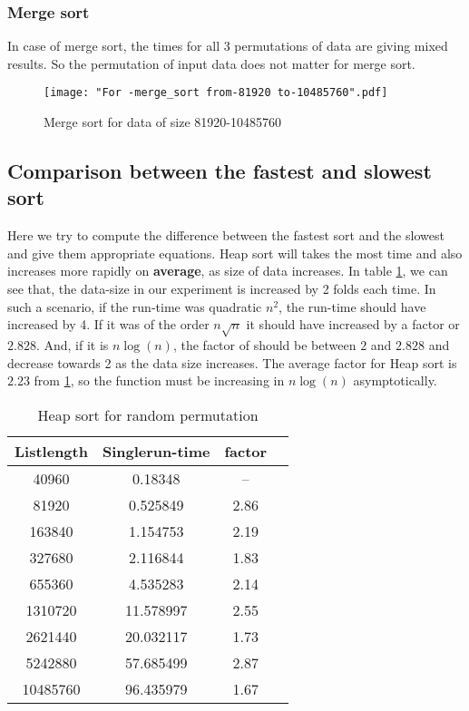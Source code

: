 \documentclass[sigconf, nonacm, natbib, screen, balance=False]{acmart}
\begin{document}
\subsubsection{Merge sort}
In case of merge sort, the times for all 3 permutations of data are giving mixed results. So the permutation of input data does not matter for merge sort.

\begin{figure}[ht]
\texttt{[image: "For -merge\_sort from-81920 to-10485760".pdf]}
    \caption{Merge sort for data of size 81920-10485760 }
    \label{fig:mergesort}
\end{figure}


\subsection{Comparison between the fastest and slowest sort}\label{math}
Here we try to compute the difference between the fastest sort and the slowest and give them appropriate equations. Heap sort will takes the most time and also increases more rapidly on \textbf{average}, as size of data increases. In table \ref{tab:table2}, we can see that, the data-size in our experiment is increased by 2 folds each time. In such a scenario, if the run-time was quadratic $n^2$, the run-time should have increased by 4. If it was of the order $n\sqrt{n}$ it should have increased by a factor or $2.828$. And, if it is $n\log(n)$, the factor of should be between $2$ and $2.828$ and decrease towards 2 as the data size increases. The average factor for Heap sort is $2.23$ from \ref{tab:table2}, so the function must be increasing in $n\log(n)$ asymptotically. 

\begin{table}[ht]
\caption{Heap sort for random permutation }
\label{tab:table2}
\begin{center}
\begin{tabular}{|c|c|c|c|} 
\hline
\textbf{Listlength} & 	\textbf{Singlerun-time} & \textbf{factor} \\ 
\hline
40960 &  0.18348 &  --  \\ 
81920 &  0.525849 &  2.86 \\ 
163840 &  1.154753 &  2.19 \\ 
327680 &  2.116844 &  1.83 \\ 
655360 &  4.535283 &  2.14 \\ 
1310720 &  11.578997 &  2.55 \\ 
2621440 &  20.032117 &  1.73 \\ 
5242880 &  57.685499 &  2.87 \\ 
10485760 &  96.435979 &  1.67 \\ 
\hline
\end{tabular}
\end{center}
\end{table}
\end{document}
